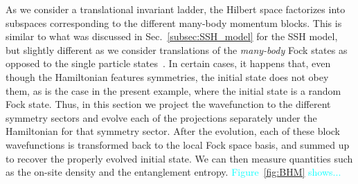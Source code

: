 \documentclass{SciPost}
\newcommand\0{\scalebox{-1}[1]{0}}
\newcommand*{\cyan}{\textcolor{cyan}}
\begin{document}
As we consider a translational invariant ladder, the Hilbert space factorizes into subspaces corresponding to the different many-body momentum blocks. This is similar to what was discussed in Sec.~\ref{subsec:SSH_model} for the SSH model, but slightly different as we consider translations of the \emph{many-body} Fock states as opposed to the single particle states~\cite{anders10}. In certain cases, it happens that, even though the Hamiltonian features symmetries, the initial state does not obey them, as is the case in the present example, where the initial state is a random Fock state. Thus, in this section we project the wavefunction to the different symmetry sectors and evolve each of the projections separately under the Hamiltonian for that symmetry sector. After the evolution, each of these block wavefunctions is transformed back to the local Fock space basis, and summed up to recover the properly evolved initial state. We can then measure quantities such as the on-site density and the entanglement entropy. \cyan{Figure~\ref{fig:BHM} shows...}
\end{document}
